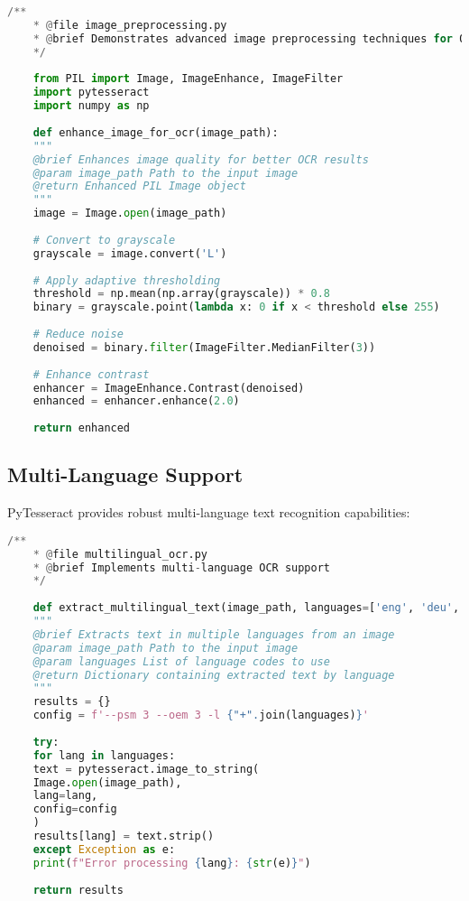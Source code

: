\begin{lstlisting}[language=Python]
	/**
	* @file image_preprocessing.py
	* @brief Demonstrates advanced image preprocessing techniques for OCR
	*/
	
	from PIL import Image, ImageEnhance, ImageFilter
	import pytesseract
	import numpy as np
	
	def enhance_image_for_ocr(image_path):
	"""
	@brief Enhances image quality for better OCR results
	@param image_path Path to the input image
	@return Enhanced PIL Image object
	"""
	image = Image.open(image_path)
	
	# Convert to grayscale
	grayscale = image.convert('L')
	
	# Apply adaptive thresholding
	threshold = np.mean(np.array(grayscale)) * 0.8
	binary = grayscale.point(lambda x: 0 if x < threshold else 255)
	
	# Reduce noise
	denoised = binary.filter(ImageFilter.MedianFilter(3))
	
	# Enhance contrast
	enhancer = ImageEnhance.Contrast(denoised)
	enhanced = enhancer.enhance(2.0)
	
	return enhanced
\end{lstlisting}

\clearpage

\subsection{Multi-Language Support}
PyTesseract provides robust multi-language text recognition capabilities:

\begin{lstlisting}[language=Python]
	/**
	* @file multilingual_ocr.py
	* @brief Implements multi-language OCR support
	*/
	
	def extract_multilingual_text(image_path, languages=['eng', 'deu', 'fra']):
	"""
	@brief Extracts text in multiple languages from an image
	@param image_path Path to the input image
	@param languages List of language codes to use
	@return Dictionary containing extracted text by language
	"""
	results = {}
	config = f'--psm 3 --oem 3 -l {"+".join(languages)}'
	
	try:
	for lang in languages:
	text = pytesseract.image_to_string(
	Image.open(image_path),
	lang=lang,
	config=config
	)
	results[lang] = text.strip()
	except Exception as e:
	print(f"Error processing {lang}: {str(e)}")
	
	return results
\end{lstlisting}

